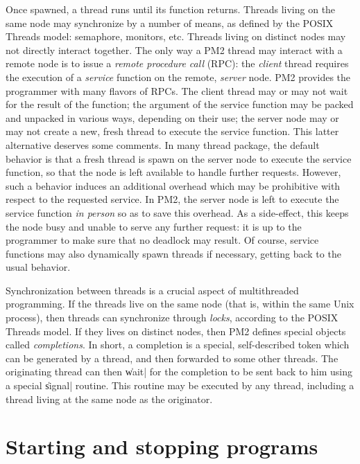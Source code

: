Once spawned, a thread runs until its function returns. Threads living
on the same node may synchronize by a number of means, as defined by
the POSIX Threads model: semaphore, monitors, etc. Threads living on
distinct nodes may not directly interact together. The only way a PM2
thread may interact with a remote node is to issue a \emph{remote
  procedure call} (RPC): the \emph{client} thread requires the
execution of a \emph{service} function on the remote, \emph{server}
node. PM2 provides the programmer with many flavors of RPCs. The
client thread may or may not wait for the result of the function; the
argument of the service function may be packed and unpacked in various
ways, depending on their use; the server node may or may not create a
new, fresh thread to execute the service function. This latter
alternative deserves some comments. In many thread package, the
default behavior is that a fresh thread is spawn on the server node to
execute the service function, so that the node is left available to
handle further requests. However, such a behavior induces an
additional overhead which may be prohibitive with respect to the requested
service. In PM2, the server node is left to execute the service
function \emph{in person} so as to save this overhead. As a
side-effect, this keeps the node busy and unable to serve any further
request: it is up to the programmer to make sure that no deadlock may
result. Of course, service functions may also dynamically spawn
threads if necessary, getting back to the usual behavior.

Synchronization between threads is a crucial aspect of multithreaded
programming. If the threads live on the same node (that is, within the
same Unix process), then threads can synchronize through \emph{locks},
according to the POSIX Threads model. If they lives on distinct nodes,
then PM2 defines special objects called \emph{completions}. In
short, a completion is a special, self-described token which can be
generated by a thread, and then forwarded to some other threads. The
originating thread can then \|wait| for the completion to be sent back
to him using a special \|signal| routine. This routine may be executed
by any thread, including a thread living at the same node as the
originator. 


\section{Starting and stopping programs}


